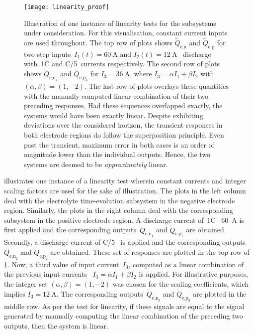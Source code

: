 \begin{figure}[!htb]
    \centering
    \texttt{[image: linearity\_proof]}
    \caption[Illustration of linearity test for the
     and
     subsystems]{Illustration of one
        instance of linearity tests for the subsystems under consideration. For
        this visualisation, constant current inputs are used throughout. The top
        row of plots shows $\widetilde{Q}_{\text{e,n}}$ and
        $\widetilde{Q}_{\text{e,p}}$ for two step inputs~${I_1(t) =
        \SI{60}{\ampere}}$ and $I_2(t) = \SI{12}{\ampere}$ \ie~discharge with~1C and C/5~currents respectively. The second row of plots shows
        $\widetilde{Q}_{\text{e,n}_3}$ and $\widetilde{Q}_{\text{e,p}_3}$  for
        ${I_3 = \SI{36}{\ampere}}$, where $I_3 = \alpha I_1 + \beta I_2$ with~${(\alpha,\beta) = (1,-2)}$. The last row of plots overlays these
        quantities with the manually computed linear combination of their two
        preceding responses. Had these sequences overlapped exactly, the systems
        would have been exactly linear. Despite exhibiting deviations over the
        considered horizon, the transient responses in both electrode regions do
        follow the superposition principle. Even past the transient, maximum
        error in both cases is an order of magnitude lower than the individual
        outputs. Hence, the two systems are deemed to be \emph{approximately}
        linear.
    }%
    \label{fig:linearity}
\end{figure}

{}  illustrates  one  instance  of a  linearity  test  wherein
constant  currents  and  integer  scaling  factors are  used  for  the  sake  of
illustration.  The  plots   in  the  left  column  deal   with  the  electrolyte
time-evolution  subsystem  in  the  negative electrode  region.  Similarly,  the
plots  in  the  right  column  deal with  the  corresponding  subsystem  in  the
positive electrode region.  A discharge current of~1C  \ie~\SI{60}{\ampere} is
first  applied  and  the  corresponding  outputs~$\widetilde{Q}_{\text{e,n}_1}$
and   $\widetilde{Q}_{\text{e,p}_1}$  are   obtained.   Secondly,  a   discharge
current   of   C/5   \ie~is    applied   and   the   corresponding   outputs~$\widetilde{Q}_{\text{e,n}_2}$ and  $\widetilde{Q}_{\text{e,p}_2}$ are obtained.
These set of responses are plotted  in the top row of \cref{fig:linearity}. Now,
a  third  value  of  input  current~$I_3$,  computed  as  a  linear  combination
of  the  previous  input  currents  \ie~${I_3 =  \alpha  I_1  +  \beta  I_2  }$
is  applied.  For  illustrative  purposes, the  integer  set  ${(\alpha,\beta)  =
    (1,-2)}$  was  chosen  for  the   scaling  coefficients,  which  implies  ${I_3  =
\SI{12}{\ampere}}$. The corresponding  outputs~$\widetilde{Q}_{\text{e,n}_3}$ and
$\widetilde{Q}_{\text{e,p}_3}$ are  plotted in the  middle row. As per  the test
for linearity,  if these signals are  equal to the signal  generated by manually
computing the linear  combination of the preceding two outputs,  then the system
is linear.

